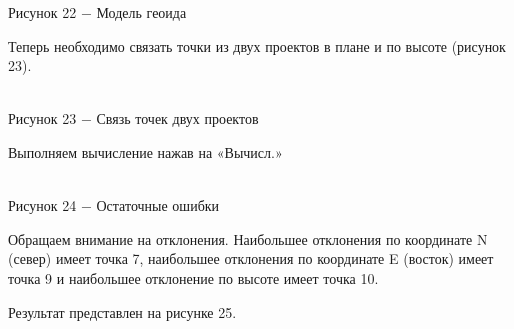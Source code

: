 \documentclass[a4paper]{article}
\begin{document}
{\begin{center}
    Рисунок 22 $-$ Модель геоида  
\end{center}
\par Теперь необходимо связать точки из двух проектов в плане и по высоте (рисунок 23). 
\begin{center}
     \\
    Рисунок 23 $-$ Связь точек двух проектов  
\end{center}
\par Выполняем вычисление нажав на «Вычисл.» 
\begin{center}
     \\
    Рисунок 24 $-$ Остаточные ошибки  
\end{center}
\par Обращаем внимание на отклонения. Наибольшее отклонения по координате N (север) имеет точка 7, наибольшее отклонения по координате E (восток) имеет точка 9 и наибольшее отклонение по высоте имеет точка 10. 
\par Результат представлен на рисунке 25.
\begin{center}
     \\

\end{center}}
\end{document}
